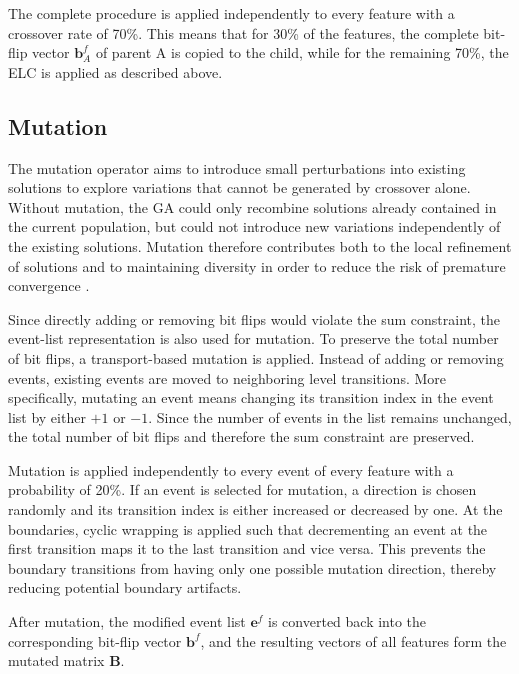     The complete procedure is applied independently to every feature with a crossover rate of 70\%. This means that for 30\% of the features, the complete bit-flip vector $\mathbf{b}^f_A$ of parent A is copied to the child, while for the remaining 70\%, the \ac{ELC} is applied as described above.

    
    \subsection{Mutation}
    \label{sec:mutation}
    The mutation operator aims to introduce small perturbations into existing solutions to explore variations that cannot be generated by crossover alone. Without mutation, the GA could only recombine solutions already contained in the current population, but could not introduce new variations independently of the existing solutions. Mutation therefore contributes both to the local refinement of solutions and to maintaining diversity in order to reduce the risk of premature convergence \cite{hassanat_enhancing_2016}.
    
    Since directly adding or removing bit flips would violate the sum constraint, the event-list representation is also used for mutation. To preserve the total number of bit flips, a transport-based mutation is applied. Instead of adding or removing events, existing events are moved to neighboring level transitions. More specifically, mutating an event means changing its transition index in the event list by either $+1$ or $-1$. Since the number of events in the list remains unchanged, the total number of bit flips and therefore the sum constraint are preserved.

    Mutation is applied independently to every event of every feature with a probability of 20\%. If an event is selected for mutation, a direction is chosen randomly and its transition index is either increased or decreased by one. At the boundaries, cyclic wrapping is applied such that decrementing an event at the first transition maps it to the last transition and vice versa. This prevents the boundary transitions from having only one possible mutation direction, thereby reducing potential boundary artifacts.
    
    After mutation, the modified event list $\mathbf{e}^f$ is converted back into the corresponding bit-flip vector $\mathbf{b}^f$, and the resulting vectors of all features form the mutated matrix $\mathbf{B}$.



